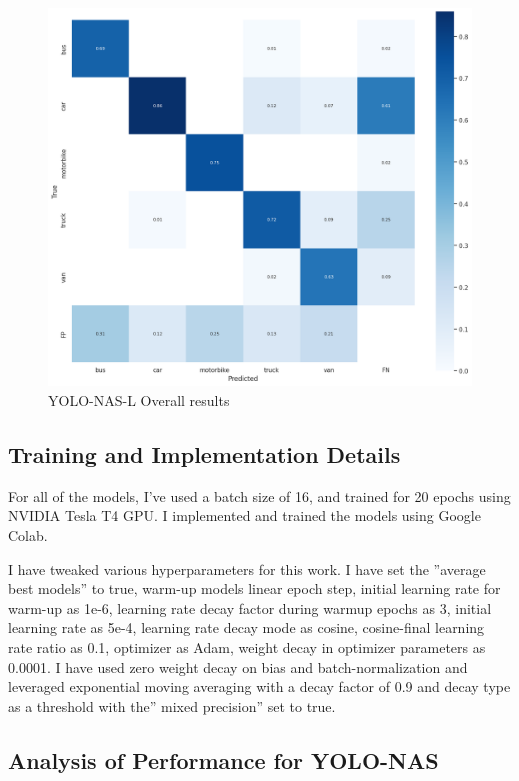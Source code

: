 \begin{figure}[H]
    \centering
    \includegraphics[width=\linewidth]{tex/img/L-confusion_matrix.png}
    \caption{YOLO-NAS-L Overall results }
    \label{fig:ConfusionMatrixY-N-S}
\end{figure}
\subsection{Training and Implementation Details}
For all of the models, I’ve used a batch size of 16, and trained for 20 epochs using NVIDIA Tesla T4 GPU. I implemented and trained the models using Google Colab. 

I have tweaked various hyperparameters for this work. I have set the ”average best models” to true, warm-up models linear epoch step, initial learning rate for warm-up as 1e-6, learning rate decay factor during warmup epochs as 3, initial learning rate as 5e-4, learning rate decay mode as cosine, cosine-final learning rate ratio as 0.1, optimizer as Adam, weight decay in optimizer parameters as 0.0001. I have used zero weight decay on bias and batch-normalization and leveraged exponential moving averaging with a decay factor of 0.9 and decay type as a threshold with the” mixed precision” set to true.
\newpage
\subsection{Analysis of Performance for YOLO-NAS}

